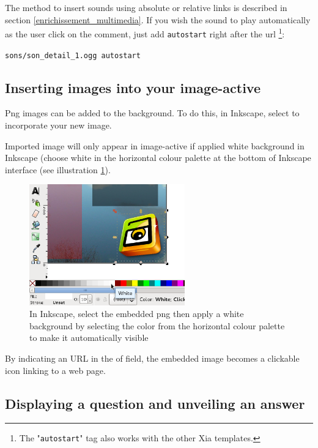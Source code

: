 The method to insert sounds using absolute or relative links is described in 
section 
\ref{enrichissement_multimedia}. If you wish the sound to play 
automatically as the user click on the comment, just add \verb|autostart| right 
after the url \footnote{The "\texttt{autostart}" tag also works with the other 
Xia templates.}:\\
\begin{center}
 \verb|sons/son_detail_1.ogg autostart|
\end{center}


\subsection{Inserting images into your image-active}\label{insertion_images}

Png images can be added to the background. To do this, in 
Inkscape, select  to incorporate your new image.

Imported image will only appear in image-active if applied white background in 
Inkscape (choose white in the horizontal colour palette at the bottom of 
Inkscape interface (see illustration \ref{remplissage_blanc}).

\begin{figure}[htp!]
 \centering\includegraphics[width=0.6\textwidth] {images/remplissage_blanc}
 \caption{In Inkscape, select the embedded png then apply a white background 
 by selecting the color from the horizontal colour palette to make it 
 automatically visible} 
 \label{remplissage_blanc}
\end{figure}

By indicating an URL in the  of  field, 
the embedded image becomes a clickable icon linking to a web page.

\subsection{Displaying a question and unveiling an answer}

